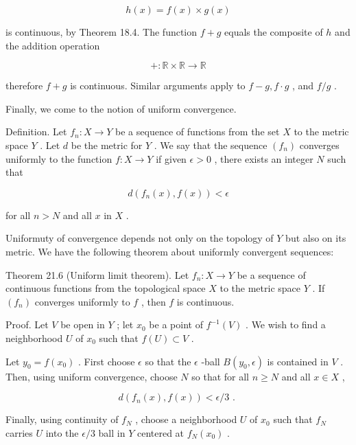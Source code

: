 \documentclass[10pt]{article}
\begin{document}
\[
h\left( x\right)  = f\left( x\right)  \times  g\left( x\right)
\]

is continuous, by Theorem 18.4. The function \(f + g\) equals the composite of \(h\) and the addition operation

\[
+  : \mathbb{R} \times  \mathbb{R} \rightarrow  \mathbb{R}
\]

therefore \(f + g\) is continuous. Similar arguments apply to \(f - g,f \cdot  g\) , and \(f/g\) .

Finally, we come to the notion of uniform convergence.

Definition. Let \({f}_{n} : X \rightarrow  Y\) be a sequence of functions from the set \(X\) to the metric space \(Y\) . Let \(d\) be the metric for \(Y\) . We say that the sequence \(\left( {f}_{n}\right)\) converges uniformly to the function \(f : X \rightarrow  Y\) if given \(\epsilon  > 0\) , there exists an integer \(N\) such that

\[
d\left( {{f}_{n}\left( x\right) ,f\left( x\right) }\right)  < \epsilon
\]

for all \(n > N\) and all \(x\) in \(X\) .

Uniformuty of convergence depends not only on the topology of \(Y\) but also on its metric. We have the following theorem about uniformly convergent sequences:

Theorem 21.6 (Uniform limit theorem). Let \({f}_{n} : X \rightarrow  Y\) be a sequence of continuous functions from the topological space \(X\) to the metric space \(Y\) . If \(\left( {f}_{n}\right)\) converges uniformly to \(f\) , then \(f\) is continuous.

Proof. Let \(V\) be open in \(Y\) ; let \({x}_{0}\) be a point of \({f}^{-1}\left( V\right)\) . We wish to find a neighborhood \(U\) of \({x}_{0}\) such that \(f\left( U\right)  \subset  V\) .

Let \({y}_{0} = f\left( {x}_{0}\right)\) . First choose \(\epsilon\) so that the \(\epsilon\) -ball \(B\left( {{y}_{0},\epsilon }\right)\) is contained in \(V\) . Then, using uniform convergence, choose \(N\) so that for all \(n \geq  N\) and all \(x \in  X\) ,

\[
d\left( {{f}_{n}\left( x\right) ,f\left( x\right) }\right)  < \epsilon /3\text{ . }
\]

Finally, using continuity of \({f}_{N}\) , choose a neighborhood \(U\) of \({x}_{0}\) such that \({f}_{N}\) carries \(U\) into the \(\epsilon /3\) ball in \(Y\) centered at \({f}_{N}\left( {x}_{0}\right)\) .
\end{document}
